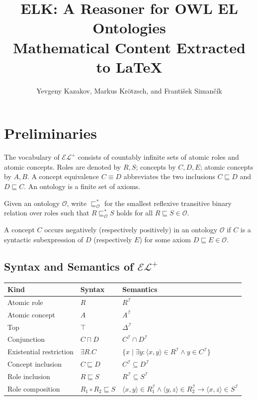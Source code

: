 \documentclass[11pt]{article}
\title{ELK: A Reasoner for OWL EL Ontologies\\Mathematical Content Extracted to LaTeX}
\author{Yevgeny Kazakov, Markus Kr\"otzsch, and Franti\v{s}ek Siman\v{c}\'ik}
\date{}
\newcommand{\Ont}{\mathcal O}
\newcommand{\interp}{\mathcal I}
\newcommand{\DeltaI}{\Delta^{\interp}}
\newcommand{\roleI}[1]{#1^{\interp}}
\newcommand{\conceptI}[1]{#1^{\interp}}
\newcommand{\sub}{\sqsubseteq}
\newcommand{\equivc}{\equiv}
\newcommand{\compose}{\circ}
\begin{document}
\maketitle

\section{Preliminaries}

The vocabulary of $\mathcal{EL}^{+}$ consists of countably infinite sets of atomic roles and atomic concepts. Roles are denoted by $R,S$; concepts by $C,D,E$; atomic concepts by $A,B$. A concept equivalence $C \equivc D$ abbreviates the two inclusions $C \sub D$ and $D \sub C$. An ontology is a finite set of axioms.

Given an ontology $\Ont$, write $\sub^{*}_{\Ont}$ for the smallest reflexive transitive binary relation over roles such that $R \sub^{*}_{\Ont} S$ holds for all $R \sub S \in \Ont$.

A concept $C$ occurs negatively (respectively positively) in an ontology $\Ont$ if $C$ is a syntactic subexpression of $D$ (respectively $E$) for some axiom $D \sub E \in \Ont$.

\subsection{Syntax and Semantics of $\mathcal{EL}^{+}$}

\begin{longtable}{>{\raggedright\arraybackslash}p{} >{\raggedright\arraybackslash}p{} >{\raggedright\arraybackslash}p{}}
\toprule
\textbf{Kind} & \textbf{Syntax} & \textbf{Semantics} \\
\midrule
\endhead
Atomic role & $R$ & $\roleI{R}$ \\
\midrule
Atomic concept & $A$ & $\conceptI{A}$ \\
Top & $\top$ & $\DeltaI$ \\
Conjunction & $C \sqcap D$ & $\conceptI{C} \cap \conceptI{D}$ \\
Existential restriction & $\exists R.C$ & $\{x \mid \exists y : \langle x,y\rangle \in \roleI{R} \land y \in \conceptI{C}\}$ \\
\midrule
Concept inclusion & $C \sub D$ & $\conceptI{C} \subseteq \conceptI{D}$ \\
Role inclusion & $R \sub S$ & $\roleI{R} \subseteq \roleI{S}$ \\
Role composition & $R_1 \compose R_2 \sub S$ & $\langle x,y\rangle \in \roleI{R_1} \land \langle y,z\rangle \in \roleI{R_2} \rightarrow \langle x,z\rangle \in \roleI{S}$ \\
\bottomrule
\end{longtable}
\end{document}
